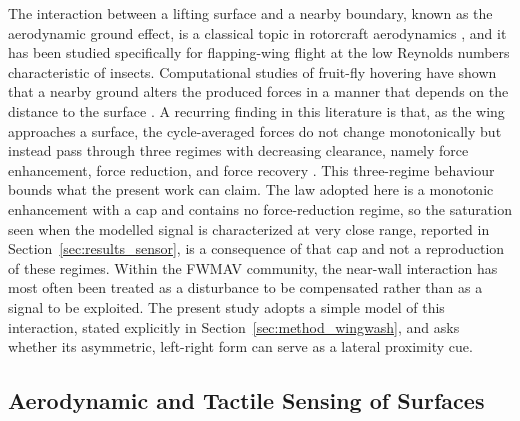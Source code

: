 \documentclass[final,5p,times]{elsarticle}
\begin{document}
The interaction between a lifting surface and a nearby boundary, known as the aerodynamic ground effect, is a classical topic in rotorcraft aerodynamics \cite{cheeseman1959effect}, and it has been studied specifically for flapping-wing flight at the low Reynolds numbers characteristic of insects. Computational studies of fruit-fly hovering have shown that a nearby ground alters the produced forces in a manner that depends on the distance to the surface \cite{maeda2013ground}. A recurring finding in this literature is that, as the wing approaches a surface, the cycle-averaged forces do not change monotonically but instead pass through three regimes with decreasing clearance, namely force enhancement, force reduction, and force recovery \cite{lu2016ground}. This three-regime behaviour bounds what the present work can claim. The law adopted here is a monotonic enhancement with a cap and contains no force-reduction regime, so the saturation seen when the modelled signal is characterized at very close range, reported in Section~\ref{sec:results_sensor}, is a consequence of that cap and not a reproduction of these regimes. Within the FWMAV community, the near-wall interaction has most often been treated as a disturbance to be compensated rather than as a signal to be exploited. The present study adopts a simple model of this interaction, stated explicitly in Section~\ref{sec:method_wingwash}, and asks whether its asymmetric, left-right form can serve as a lateral proximity cue.

\subsection{Aerodynamic and Tactile Sensing of Surfaces}
\label{sec:rw_sensing}
\end{document}
